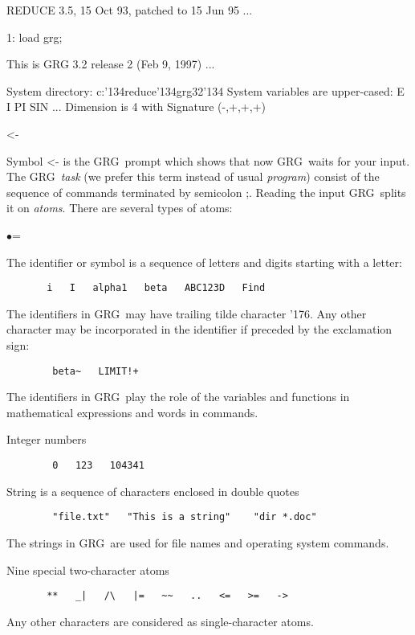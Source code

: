 \documentclass[twoside,openright]{report}
\newcommand{\grgtt}{\ttfamily}
\renewcommand{\tt}{\grgtt}
\newcommand{\bs}{{\tt \char'134}}           %
\newcommand{\cc}{{\tt \char'176}}           %
\newcommand{\grg}{{\sc GRG}}
\newcommand{\comm}[1]{{\upshape\tt#1}}    %
\begin{document}
\begin{slisting}
REDUCE 3.5, 15 Oct 93, patched to 15 Jun 95 ...

1: load grg;

This is GRG 3.2 release 2 (Feb 9, 1997) ...

System directory: c:{\bs}reduce{\bs}grg32{\bs}
System variables are upper-cased: E I PI SIN ...
Dimension is 4 with Signature (-,+,+,+)

<-
\end{slisting}
Symbol \comm{<-} is the \grg\ prompt which shows that
now \grg\ waits for your input. The \grg\ \emph{task} (we prefer
this term instead of usual \emph{program}) consist of the
sequence of commands terminated by semicolon \comm{;}.
Reading the input \grg\ splits it on \emph{atoms}.
There are several types of atoms:
\begin{list}{$\bullet$}{\leftmargin=\parindent}
\item The identifier or symbol is a sequence of letters and digits
starting with a letter:
\begin{verbatim}
       i   I   alpha1   beta   ABC123D   Find
\end{verbatim}
The identifiers in \grg\ may have trailing tilde character \cc.
Any other character may be incorporated in the identifier if
preceded by the exclamation sign:
\begin{verbatim}
        beta~   LIMIT!+
\end{verbatim}
The identifiers in \grg\ play the role of the variables and
functions in mathematical expressions and words in commands.

\item Integer numbers
\begin{verbatim}
        0   123   104341
\end{verbatim}

\item String is a sequence of characters enclosed in double quotes
\begin{verbatim}
        "file.txt"   "This is a string"    "dir *.doc"
\end{verbatim}
The strings in \grg\ are used for file names and operating system
commands.

\item Nine special two-character atoms
\begin{verbatim}
       **   _|   /\   |=   ~~   ..   <=   >=   ->
\end{verbatim}

\item Any other characters are considered as single-character atoms.
\end{list}
\end{document}
